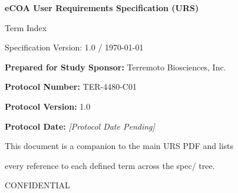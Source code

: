 
\thispagestyle{empty}

\vspace*{2cm}

\begin{center}
  {\Huge\bfseries eCOA User Requirements Specification (URS)\par}
  \vspace{0.5cm}
  {\LARGE Term Index\par}
  \vspace{1.5cm}
  {\Large Specification Version: 1.0 / \today\par}
\end{center}

\vspace{4cm}

\noindent\textbf{Prepared for Study Sponsor:} Terremoto Biosciences, Inc.\par
\vspace{0.5em}
\noindent\textbf{Protocol Number:} TER-4480-C01\par
\vspace{0.5em}
\noindent\textbf{Protocol Version:} 1.0\par
\vspace{0.5em}
\noindent\textbf{Protocol Date:} \textit{[Protocol Date Pending]}\par

\vfill

\begin{center}
  \small This document is a companion to the main URS PDF and lists\par
  every reference to each defined term across the spec/ tree.\par
  \vspace{0.5em}
  CONFIDENTIAL\par
\end{center}
